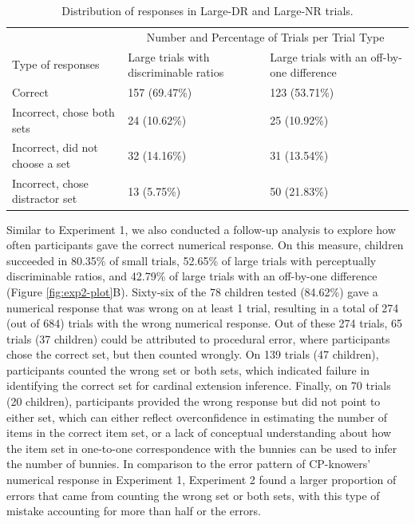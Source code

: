 \documentclass[
  man,floatsintext]{apa7}
\begin{document}
\begin{table}[tbp]

\begin{center}
\begin{threeparttable}

\caption{\label{tab:table2}Distribution of responses in Large-DR and Large-NR trials.}

\begin{tabular}{m{6cm}m{4.5cm}m{4.5cm}}
\toprule
 & \multicolumn{2}{c}{Number and Percentage of Trials per Trial Type} \\
\cmidrule(r){2-3}
Type of responses & Large trials with discriminable ratios & Large trials with an off-by-one difference\\
\midrule
Correct & 157 (69.47\%) & 123 (53.71\%)\\
Incorrect, chose both sets & 24 (10.62\%) & 25 (10.92\%)\\
Incorrect, did not choose a set & 32 (14.16\%) & 31 (13.54\%)\\
Incorrect, chose distractor set & 13 (5.75\%) & 50 (21.83\%)\\
\bottomrule
\end{tabular}

\end{threeparttable}
\end{center}

\end{table}

Similar to Experiment 1, we also conducted a follow-up analysis to explore how often participants gave the correct numerical response. On this measure, children succeeded in 80.35\% of small trials, 52.65\% of large trials with perceptually discriminable ratios, and 42.79\% of large trials with an off-by-one difference (Figure \ref{fig:exp2-plot}B).
Sixty-six of the 78 children tested (84.62\%) gave a numerical response that was wrong on at least 1 trial, resulting in a total of 274 (out of 684) trials with the wrong numerical response.
Out of these 274 trials, 65 trials (37 children) could be attributed to procedural error, where participants chose the correct set, but then counted wrongly.
On 139 trials (47 children), participants counted the wrong set or both sets, which indicated failure in identifying the correct set for cardinal extension inference.
Finally, on 70 trials (20 children), participants provided the wrong response but did not point to either set, which can either reflect overconfidence in estimating the number of items in the correct item set, or a lack of conceptual understanding about how the item set in one-to-one correspondence with the bunnies can be used to infer the number of bunnies. In comparison to the error pattern of CP-knowers' numerical response in Experiment 1, Experiment 2 found a larger proportion of errors that came from counting the wrong set or both sets, with this type of mistake accounting for more than half or the errors.
\end{document}
